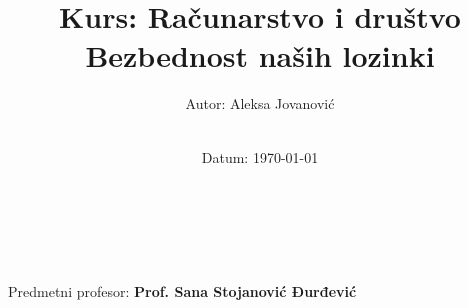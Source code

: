 \title{\Large Kurs: Računarstvo i društvo  \\[0.5cm]
        \bf\Large Bezbednost naših lozinki}
\author{\large Autor: Aleksa Jovanović\\ \ \\}
\date{\large Datum: \today}

\makeatletter
    \begin{titlepage}
        \begin{center}
	    {\ \\ \ \\}
        \vbox{}\vspace{5cm}
            {\@title }\\[3cm] 
            {\@author}
            {\large Predmetni profesor: \bf Prof. Sana Stojanović Đurđević\\  \ \\}
            {\@date\\}

        \end{center}
    \end{titlepage}
\makeatother